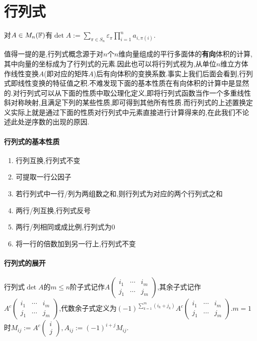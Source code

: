 \documentclass[openany]{book}
\begin{document}
\section{行列式}
\begin{definition}[行列式]
    对$A\in M_n(\mathbb{F})$有$\det A:=\sum_{\pi\in S_n}\varepsilon_\pi \prod_{i=1}^n a_{i,\pi(i)}$.
\end{definition}
值得一提的是,行列式概念源于对$n$个$n$维向量组成的平行多面体的\textbf{有向}体积的计算,其中向量的坐标成为了行列式的元素.因此也可以将行列式视为,从单位$n$维立方体作线性变换$A$(即对应的矩阵$A$)后有向体积的变换系数.事实上我们后面会看到,行列式即线性变换的特征值之积.不难发现下面的基本性质在有向体积的计算中是显然的.对行列式可以从下面的性质中取公理化定义,即将行列式函数当作一个多重线性斜对称映射,且满足下列的某些性质,即可得到其他所有性质.而行列式的上述置换定义实际上就是通过下面的性质对行列式中元素直接进行计算得来的,在此我们不论述此处逆序数的出现的原因.
\paragraph{行列式的基本性质}
\begin{enumerate}
    \item 行列互换,行列式不变
    \item 可提取一行公因子
    \item 若行列式中一行/列为两组数之和,则行列式为对应的两个行列式之和
    \item 两行/列互换,行列式反号
    \item 两行/列相同或成比例,行列式为0
    \item 将一行的倍数加到另一行上,行列式不变
\end{enumerate}

\paragraph{行列式的展开}
行列式$\det A$的$m\leq n$阶子式记作$A\begin{pmatrix}
    i_1&\cdots&i_m\\j_1&\cdots&j_m
\end{pmatrix}$,其余子式记作$A^c\begin{pmatrix}
    i_1&\cdots&i_m\\j_1&\cdots&j_m
\end{pmatrix}$,代数余子式定义为$(-1)^{\sum_{k=1}^m(i_k+j_k)}A^c\begin{pmatrix}
    i_1&\cdots&i_m\\j_1&\cdots&j_m
\end{pmatrix}$.$m=1$时$M_{ij}:=A^c\begin{pmatrix}i\\j\end{pmatrix},A_{ij}:=(-1)^{i+j}M_{ij}$.
\end{document}
